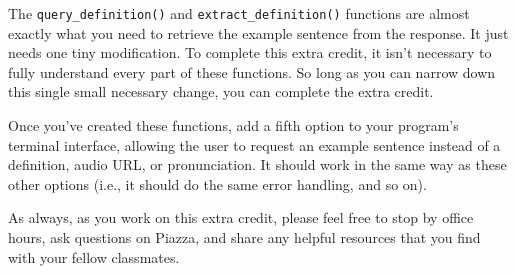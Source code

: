 \documentclass{article}
\newenvironment{hint}
    {\begin{tcolorbox}[title=Hint,colframe=white!70!blue,colback=white]}
    {\end{tcolorbox}}
\begin{document}
\begin{hint}
    The \texttt{query\_definition()} and \texttt{extract\_definition()} functions are almost exactly what you need to retrieve the example sentence from the response. It just needs one tiny modification. To complete this extra credit, it isn't necessary to fully understand every part of these functions. So long as you can narrow down this single small necessary change, you can complete the extra credit.
\end{hint}

Once you've created these functions, add a fifth option to your program's terminal interface, allowing the user to request an example sentence instead of a definition, audio URL, or pronunciation. It should work in the same way as these other options (i.e., it should do the same error handling, and so on).

As always, as you work on this extra credit, please feel free to stop by office hours, ask questions on Piazza, and share any helpful resources that you find with your fellow classmates.
\end{document}
